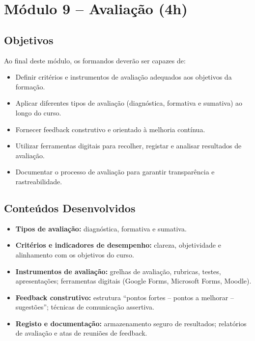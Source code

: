 \section{\textcolor{sectionred}{Módulo 9 – Avaliação (4h)}}

\subsection{\textcolor{subsectionblue}{Objetivos}}
Ao final deste módulo, os formandos deverão ser capazes de:
\begin{itemize}
  \item Definir critérios e instrumentos de avaliação adequados aos objetivos da formação.  
  \item Aplicar diferentes tipos de avaliação (diagnóstica, formativa e sumativa) ao longo do curso.  
  \item Fornecer feedback construtivo e orientado à melhoria contínua.  
  \item Utilizar ferramentas digitais para recolher, registar e analisar resultados de avaliação.  
  \item Documentar o processo de avaliação para garantir transparência e rastreabilidade.
\end{itemize}

\subsection{\textcolor{subsectionblue}{Conteúdos Desenvolvidos}}
\begin{itemize}
  \item \textbf{Tipos de avaliação:} diagnóstica, formativa e sumativa.
  \item \textbf{Critérios e indicadores de desempenho:} clareza, objetividade e alinhamento com os objetivos do curso.
  \item \textbf{Instrumentos de avaliação:} grelhas de avaliação, rubricas, testes, apresentações; ferramentas digitais (Google Forms, Microsoft Forms, Moodle).
  \item \textbf{Feedback construtivo:} estrutura “pontos fortes – pontos a melhorar – sugestões”; técnicas de comunicação assertiva.
  \item \textbf{Registo e documentação:} armazenamento seguro de resultados; relatórios de avaliação e atas de reuniões de feedback.
\end{itemize}

